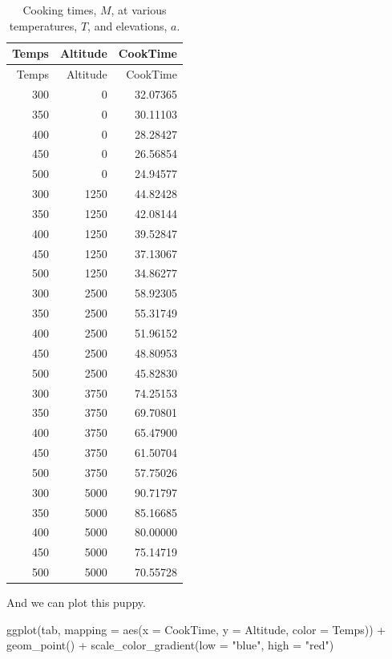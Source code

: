 \documentclass[
]{article}
\newenvironment{Shaded}{\begin{snugshade}}{\end{snugshade}}
\newcommand{\AttributeTok}[1]{\textcolor[rgb]{0.77,0.63,0.00}{#1}}
\newcommand{\FunctionTok}[1]{\textcolor[rgb]{0.00,0.00,0.00}{#1}}
\newcommand{\NormalTok}[1]{#1}
\newcommand{\SpecialCharTok}[1]{\textcolor[rgb]{0.00,0.00,0.00}{#1}}
\newcommand{\StringTok}[1]{\textcolor[rgb]{0.31,0.60,0.02}{#1}}
\begin{document}
\begin{longtable}[]{@{}rrr@{}}
\caption{Cooking times, \(M\), at various temperatures, \(T\), and
elevations, \(a\).}\tabularnewline
\toprule
Temps & Altitude & CookTime \\
\midrule
\endfirsthead
\toprule
Temps & Altitude & CookTime \\
\midrule
\endhead
300 & 0 & 32.07365 \\
350 & 0 & 30.11103 \\
400 & 0 & 28.28427 \\
450 & 0 & 26.56854 \\
500 & 0 & 24.94577 \\
300 & 1250 & 44.82428 \\
350 & 1250 & 42.08144 \\
400 & 1250 & 39.52847 \\
450 & 1250 & 37.13067 \\
500 & 1250 & 34.86277 \\
300 & 2500 & 58.92305 \\
350 & 2500 & 55.31749 \\
400 & 2500 & 51.96152 \\
450 & 2500 & 48.80953 \\
500 & 2500 & 45.82830 \\
300 & 3750 & 74.25153 \\
350 & 3750 & 69.70801 \\
400 & 3750 & 65.47900 \\
450 & 3750 & 61.50704 \\
500 & 3750 & 57.75026 \\
300 & 5000 & 90.71797 \\
350 & 5000 & 85.16685 \\
400 & 5000 & 80.00000 \\
450 & 5000 & 75.14719 \\
500 & 5000 & 70.55728 \\
\bottomrule
\end{longtable}

And we can plot this puppy.

\begin{Shaded}
\begin{Highlighting}[]
\FunctionTok{ggplot}\NormalTok{(tab, }\AttributeTok{mapping =} \FunctionTok{aes}\NormalTok{(}\AttributeTok{x =}\NormalTok{ CookTime, }\AttributeTok{y =}\NormalTok{ Altitude, }\AttributeTok{color =}\NormalTok{ Temps)) }\SpecialCharTok{+} 
  \FunctionTok{geom\_point}\NormalTok{() }\SpecialCharTok{+}
  \FunctionTok{scale\_color\_gradient}\NormalTok{(}\AttributeTok{low =} \StringTok{"blue"}\NormalTok{, }\AttributeTok{high =} \StringTok{"red"}\NormalTok{)}
\end{Highlighting}
\end{Shaded}
\end{document}
